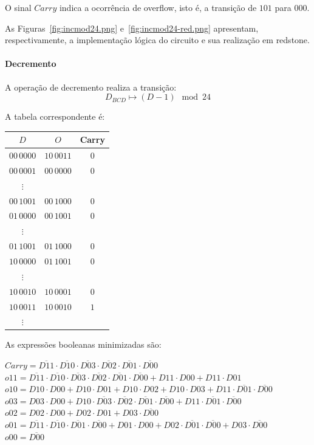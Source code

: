 O sinal $Carry$ indica a ocorrência de overflow, isto é, a transição de $101$ para $000$.

As Figuras~\ref{fig:incmod24.png} e~\ref{fig:incmod24-red.png} apresentam, respectivamente, a implementação lógica do circuito e sua realização em redstone.


\paragraph{Decremento}

A operação de decremento realiza a transição:
\[
D_{BCD} \mapsto (D - 1) \mod 24
\]

A tabela correspondente é:

\begin{center}
\begin{tabular}{c|cc}
$D$ & $O$ & Carry \\
\hline
$00\,0000$ & $10\,0011$ & $0$ \\
$00\,0001$ & $00\,0000$ & $0$ \\
$\vdots$ &  &  \\
$00\,1001$ & $00\,1000$ & $0$ \\
$01\,0000$ & $00\,1001$ & $0$ \\
$\vdots$ &  &  \\
$01\,1001$ & $01\,1000$ & $0$ \\
$10\,0000$ & $01\,1001$ & $0$ \\
$\vdots$ &  &  \\
$10\,0010$ & $10\,0001$ & $0$ \\
$10\,0011$ & $10\,0010$ & $1$ \\
$\vdots$ &  &  \\
\end{tabular}
\end{center}
As expressões booleanas minimizadas são:

$Carry =  \overline{D11}  \cdot  \overline{D10}  \cdot  \overline{D03}  \cdot  \overline{D02}  \cdot  \overline{D01}  \cdot  \overline{D00} $~\\
$o11 =  \overline{D11}  \cdot  \overline{D10}  \cdot  \overline{D03}  \cdot  \overline{D02}  \cdot  \overline{D01}  \cdot  \overline{D00} +D11 \cdot D00+D11 \cdot D01$~\\
$o10 = D10 \cdot D00+D10 \cdot D01+D10 \cdot D02+D10 \cdot D03+D11 \cdot  \overline{D01}  \cdot  \overline{D00} $~\\
$o03 = D03 \cdot D00+D10 \cdot  \overline{D03}  \cdot  \overline{D02}  \cdot  \overline{D01}  \cdot  \overline{D00} +D11 \cdot  \overline{D01}  \cdot  \overline{D00} $~\\
$o02 = D02 \cdot D00+D02 \cdot D01+D03 \cdot  \overline{D00} $~\\
$o01 =  \overline{D11}  \cdot  \overline{D10}  \cdot  \overline{D01}  \cdot  \overline{D00} +D01 \cdot D00+D02 \cdot  \overline{D01}  \cdot  \overline{D00} +D03 \cdot  \overline{D00} $~\\
$o00 =  \overline{D00} $~\\

